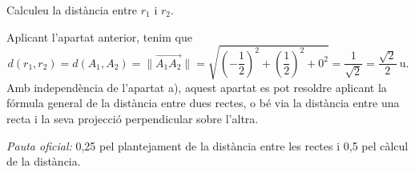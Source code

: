 \begin{apartats}
Calculeu la distància entre $r_1$ i $r_2$.

\begin{solucio}
Aplicant l'apartat anterior, tenim que
\[
d(r_1,r_2)=d(A_1,A_2)=\bigl\|\overrightarrow{A_1A_2}\bigr\|=\sqrt{\left(-\frac12\right)^2+\left(\frac12\right)^2+0^2}
=\frac{1}{\sqrt2}=\boxed{\frac{\sqrt2}{2}\ \text{u}}.
\]
Amb independència de l'apartat a), aquest apartat es pot resoldre aplicant la fórmula general de la distància
entre dues rectes, o bé via la distància entre una recta i la seva projecció perpendicular sobre l'altra.

\textit{Pauta oficial:} 0,25 pel plantejament de la distància entre les rectes i 0,5 pel càlcul de la distància.
\end{solucio}

\end{apartats}
